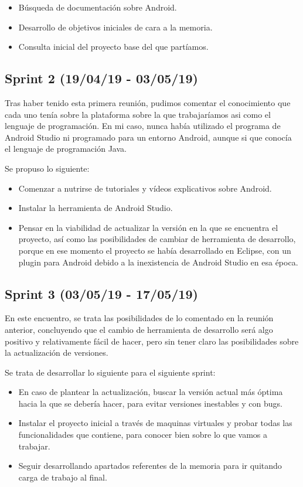 \begin{itemize}
\item Búsqueda de documentación sobre Android.
\item Desarrollo de objetivos iniciales de cara a la memoria.
\item Consulta inicial del proyecto base del que partíamos.
\end{itemize}

\subsection{Sprint 2 (19/04/19 - 03/05/19)}

Tras haber tenido esta primera reunión, pudimos comentar el conocimiento que cada uno tenía sobre la plataforma sobre la que trabajaríamos asi como el lenguaje de programación. En mi caso, nunca había utilizado el programa de Android Studio ni programado para un entorno Android, aunque si que conocía el lenguaje de programación Java.

Se propuso lo siguiente:

\begin{itemize}
\item Comenzar a nutrirse de tutoriales y vídeos explicativos sobre Android.
\item Instalar la herramienta de Android Studio.
\item Pensar en la viabilidad de actualizar la versión en la que se encuentra el proyecto, así como las posibilidades de cambiar de herramienta de desarrollo, porque en ese momento el proyecto se había desarrollado en Eclipse, con un plugin para Android debido a la inexistencia de Android Studio en esa época.
\end{itemize}

\subsection{Sprint 3 (03/05/19 - 17/05/19)}

En este encuentro, se trata las posibilidades de lo comentado en la reunión anterior, concluyendo que el cambio de herramienta de desarrollo será algo positivo y relativamente fácil de hacer, pero sin tener claro las posibilidades sobre la actualización de versiones. 

Se trata de desarrollar lo siguiente para el siguiente sprint:

\begin{itemize}
\item En caso de plantear la actualización, buscar la versión actual más óptima hacia la que se debería hacer, para evitar versiones inestables y con bugs.
\item Instalar el proyecto inicial a través de maquinas virtuales y probar todas las funcionalidades que contiene, para conocer bien sobre lo que vamos a trabajar.
\item Seguir desarrollando apartados referentes de la memoria para ir quitando carga de trabajo al final.
\end{itemize}

